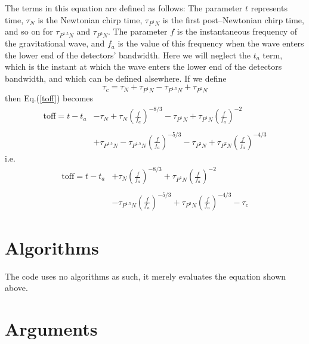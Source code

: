 \documentclass[12pt]{article}
\begin{document}
The terms in this equation are defined as follows:
The parameter $t$ represents time, $\tau_{N}$ is the Newtonian chirp time, $\tau_{P^{1}N}$ is the first post--Newtonian chirp time, and so on for $\tau_{P^{1.5}N}$ and $\tau_{P^{2}N}$. The parameter $f$ is the instantaneous frequency of the gravitational wave, and $f_{a}$ is the value of this frequency when the wave enters the lower end of the detectors' bandwidth. Here we will neglect the $t_{a}$ term, which is the instant at which the wave enters the lower end of the detectors bandwidth, and which can be defined alsewhere. If we define 
\begin{equation}
\tau_{c} = \tau_{N} + \tau_{P^{1}N} - \tau_{P^{1.5}N} + \tau_{P^{2}N}
\end{equation}
then Eq.(\ref{toff}) becomes
\begin{equation}
\begin{split}
\mathrm{toff} = t - t_{a}  &  - \tau_{N} + \tau_{N}\left( \frac{f}{f_{a}} \right)^{-8/3} - \tau_{P^{1}N} + \tau_{P^{1}N} \left( \frac{f}{f_{a}} \right)^{-2} \\
      &      \\
      & + \tau_{P^{1.5}N} - \tau_{P^{1.5}N} \left( \frac{f}{f_{a}} \right)^{-5/3} - \tau_{P^{2}N} + \tau_{P^{2}N} \left( \frac{f}{f_{a}} \right)^{-4/3}
\end{split}
\end{equation}
i.e.\
\begin{equation}
\begin{split}
\mathrm{toff} = t - t_{a}  &  + \tau_{N} \left( \frac{f}{f_{a}} \right)^{-8/3} + \tau_{P^{1}N} \left( \frac{f}{f_{a}} \right)^{-2} \\
   &   \\
   & - \tau_{P^{1.5}N} \left( \frac{f}{f_{a}} \right)^{-5/3} + \tau_{P^{2}N} \left( \frac{f}{f_{a}} \right)^{-4/3} - \tau_{c}
\end{split}
\label{toff2}
\end{equation}




\section{Algorithms}

The code uses no algorithms as such, it merely evaluates the equation shown above.

\section{Arguments}
\end{document}
